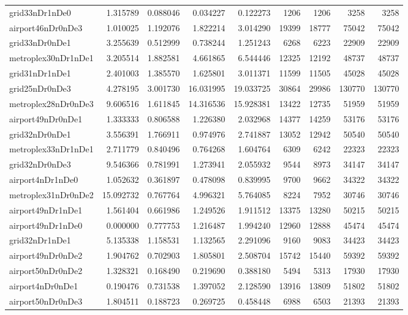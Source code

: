 \begin{longtable}{|l|r|r|r|r|r|r|r|r|}
grid33nDr1nDe0 & 1.315789 & 0.088046 & 0.034227 & 0.122273 & 1206 & 1206 & 3258 & 3258 \\
airport46nDr0nDe3 & 1.010025 & 1.192076 & 1.822214 & 3.014290 & 19399 & 18777 & 75042 & 75042 \\
grid33nDr0nDe1 & 3.255639 & 0.512999 & 0.738244 & 1.251243 & 6268 & 6223 & 22909 & 22909 \\
metroplex30nDr1nDe1 & 3.205514 & 1.882581 & 4.661865 & 6.544446 & 12325 & 12192 & 48737 & 48737 \\
grid31nDr1nDe1 & 2.401003 & 1.385570 & 1.625801 & 3.011371 & 11599 & 11505 & 45028 & 45028 \\
grid25nDr0nDe3 & 4.278195 & 3.001730 & 16.031995 & 19.033725 & 30864 & 29986 & 130770 & 130770 \\
metroplex28nDr0nDe3 & 9.606516 & 1.611845 & 14.316536 & 15.928381 & 13422 & 12735 & 51959 & 51959 \\
airport49nDr0nDe1 & 1.333333 & 0.806588 & 1.226380 & 2.032968 & 14377 & 14259 & 53176 & 53176 \\
grid32nDr0nDe1 & 3.556391 & 1.766911 & 0.974976 & 2.741887 & 13052 & 12942 & 50540 & 50540 \\
metroplex33nDr1nDe1 & 2.711779 & 0.840496 & 0.764268 & 1.604764 & 6309 & 6242 & 22323 & 22323 \\
grid32nDr0nDe3 & 9.546366 & 0.781991 & 1.273941 & 2.055932 & 9544 & 8973 & 34147 & 34147 \\
airport4nDr1nDe0 & 1.052632 & 0.361897 & 0.478098 & 0.839995 & 9700 & 9662 & 34322 & 34322 \\
metroplex31nDr0nDe2 & 15.092732 & 0.767764 & 4.996321 & 5.764085 & 8224 & 7952 & 30746 & 30746 \\
airport49nDr1nDe1 & 1.561404 & 0.661986 & 1.249526 & 1.911512 & 13375 & 13280 & 50215 & 50215 \\
airport49nDr1nDe0 & 0.000000 & 0.777753 & 1.216487 & 1.994240 & 12960 & 12888 & 45474 & 45474 \\
grid32nDr1nDe1 & 5.135338 & 1.158531 & 1.132565 & 2.291096 & 9160 & 9083 & 34423 & 34423 \\
airport49nDr0nDe2 & 1.904762 & 0.702903 & 1.805801 & 2.508704 & 15742 & 15440 & 59392 & 59392 \\
airport50nDr0nDe2 & 1.328321 & 0.168490 & 0.219690 & 0.388180 & 5494 & 5313 & 17930 & 17930 \\
airport4nDr0nDe1 & 0.190476 & 0.731538 & 1.397052 & 2.128590 & 13916 & 13809 & 51802 & 51802 \\
airport50nDr0nDe3 & 1.804511 & 0.188723 & 0.269725 & 0.458448 & 6988 & 6503 & 21393 & 21393 \\

\end{longtable}

